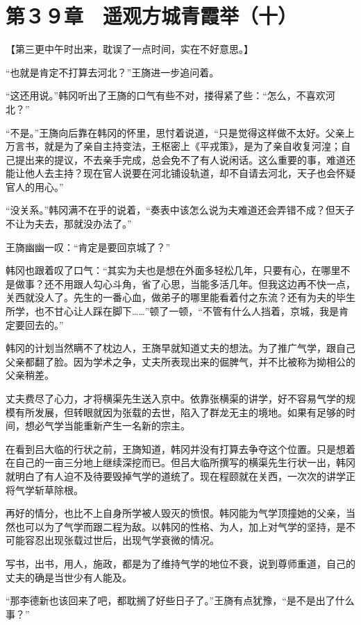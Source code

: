\section{第３９章　遥观方城青霞举（十）}

【第三更中午时出来，耽误了一点时间，实在不好意思。】

“也就是肯定不打算去河北？”王旖进一步追问着。

“这还用说。”韩冈听出了王旖的口气有些不对，搂得紧了些：“怎么，不喜欢河北？”

“不是。”王旖向后靠在韩冈的怀里，思忖着说道，“只是觉得这样做不太好。父亲上万言书，就是为了亲自主持变法，王枢密上《平戎策》，是为了亲自收复河湟；自己提出来的提议，不去亲手完成，总会免不了有人说闲话。这么重要的事，难道还能让他人去主持？现在官人说要在河北铺设轨道，却不自请去河北，天子也会怀疑官人的用心。”

“没关系。”韩冈满不在乎的说着，“奏表中该怎么说为夫难道还会弄错不成？但天子不让为夫去，那就没办法了。”

王旖幽幽一叹：“肯定是要回京城了？”

韩冈也跟着叹了口气：“其实为夫也是想在外面多轻松几年，只要有心，在哪里不是做事？还不用跟人勾心斗角，省了心思，当能多活几年。但我这边再不快一点，关西就没人了。先生的一番心血，做弟子的哪里能看着付之东流？还有为夫的毕生所学，也不甘心让人踩在脚下……”顿了一顿，“不管有什么人挡着，京城，我是肯定要回去的。”

韩冈的计划当然瞒不了枕边人，王旖早就知道丈夫的想法。为了推广气学，跟自己父亲都翻了脸。因为学术之争，丈夫所表现出来的倔脾气，并不比被称为拗相公的父亲稍差。

丈夫费尽了心力，才将横渠先生送入京中。依靠张横渠的讲学，好不容易气学的规模有所发展，但转眼就因为张载的去世，陷入了群龙无主的境地。如果有足够的时间，想必气学当能重新产生一名新的宗主。

在看到吕大临的行状之前，王旖知道，韩冈并没有打算去争夺这个位置。只是想着在自己的一亩三分地上继续深挖而已。但吕大临所撰写的横渠先生行状一出，韩冈就明白了有人迫不及待要毁掉气学的道统了。现在程颐就在关西，一次次的讲学正将气学斩草除根。

再好的情分，也比不上自身所学被人毁灭的愤恨。韩冈能为气学顶撞她的父亲，当然也可以为了气学而跟二程为敌。以韩冈的性格、为人，加上对气学的坚持，是不可能容忍出现张载过世后，出现气学衰微的情况。

写书，出书，用人，施政，都是为了维持气学的地位不衰，说到尊师重道，自己的丈夫的确是当世少有人能及。

“那李德新也该回来了吧，都耽搁了好些日子了。”王旖有点犹豫，“是不是出了什么事？”


